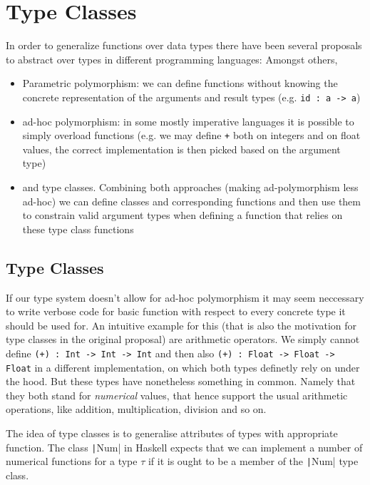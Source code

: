 \chapter{Type Classes}\label{ch:typeclasses}

In order to generalize functions over data types there have been several proposals to abstract over types in different programming languages:
Amongst others,
\begin{itemize}
\item Parametric polymorphism: we can define functions without knowing the concrete representation of the arguments and result types (e.g. \texttt{id : a -> a}) %
\item ad-hoc polymorphism: in some mostly imperative languages it is possible to simply overload functions (e.g. we may define \texttt{+} both on integers and on float values, the correct implementation is then picked based on the argument type) %
\item and type classes. Combining both approaches (making ad-polymorphism less ad-hoc) we can define classes and corresponding functions and then use them to constrain valid argument types when defining a function that relies on these type class functions \cite{wadlerblott}
\end{itemize}

\section{Type Classes}

If our type system doesn't allow for ad-hoc polymorphism it may seem neccessary to write verbose code for basic function with respect to every concrete type it should be used for.
An intuitive example for this (that is also the motivation for type classes in the original proposal) are arithmetic operators.
We simply cannot define \texttt{(+) : Int -> Int -> Int} and then also \texttt{(+) : Float -> Float -> Float} in a different implementation, on which both types definetly rely on under the hood.
But these types have nonetheless something in common. Namely that they both stand for \emph{numerical} values, that hence support the usual arithmetic operations, like addition, multiplication, division and so on.

The idea of type classes is to generalise attributes of types with appropriate function.
The class \texttt|Num| in Haskell expects that we can implement a number of numerical functions for a type $\tau$ if it is ought to be a member of the \texttt|Num| type class.

